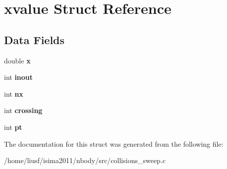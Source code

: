 \hypertarget{structxvalue}{
\section{xvalue Struct Reference}
\label{structxvalue}
}
\subsection*{Data Fields}
\begin{DoxyCompactItemize}
\item 
\hypertarget{structxvalue_a932034498a262a8dbe76cf7ccb4564ea}{
double {\bfseries x}}
\label{structxvalue_a932034498a262a8dbe76cf7ccb4564ea}

\item 
\hypertarget{structxvalue_a3da15f862d89435ea04fce0dcb8ba867}{
int {\bfseries inout}}
\label{structxvalue_a3da15f862d89435ea04fce0dcb8ba867}

\item 
\hypertarget{structxvalue_a120f1ff0906fb937924acf39c51ca5d0}{
int {\bfseries nx}}
\label{structxvalue_a120f1ff0906fb937924acf39c51ca5d0}

\item 
\hypertarget{structxvalue_a095b35466073fb4de1ee6866b2dbba51}{
int {\bfseries crossing}}
\label{structxvalue_a095b35466073fb4de1ee6866b2dbba51}

\item 
\hypertarget{structxvalue_a0549512d71385b7b47ba522b40ae0538}{
int {\bfseries pt}}
\label{structxvalue_a0549512d71385b7b47ba522b40ae0538}

\end{DoxyCompactItemize}


The documentation for this struct was generated from the following file:\begin{DoxyCompactItemize}
\item 
/home/liusf/isima2011/nbody/src/collisions\_\-sweep.c\end{DoxyCompactItemize}
